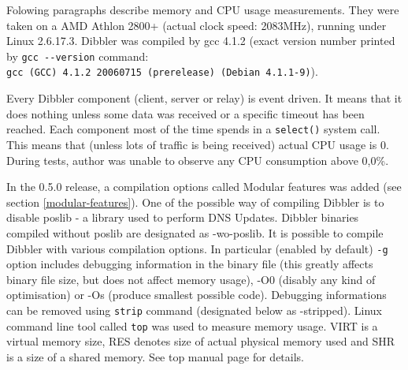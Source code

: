 Folowing paragraphs describe memory and CPU usage measurements. They
were taken on a AMD Athlon 2800+ (actual clock speed: 2083MHz),
running under Linux 2.6.17.3. Dibbler was compiled by gcc 4.1.2
(exact version number printed by \verb+gcc --version+ command: \\
\verb+gcc (GCC) 4.1.2 20060715 (prerelease) (Debian 4.1.1-9)+).

Every Dibbler component (client, server or relay) is event driven. It
means that it does nothing unless some data was received or a specific
timeout has been reached. Each component most of the time spends in a
\verb+select()+ system call. This means that (unless lots of traffic
is being received) actual CPU usage is 0. During tests, author was
unable to observe any CPU consumption above 0,0\%. 

In the 0.5.0 release, a compilation options called Modular features
was added (see section \ref{modular-features}). One of the possible
way of compiling Dibbler is to disable poslib - a library used to
perform DNS Updates. Dibbler binaries compiled without poslib are
designated as -wo-poslib. It is possible to compile Dibbler with
various compilation options. In particular (enabled by default)
\verb+-g+ option includes debugging information in the binary file
(this greatly affects binary file size, but does not affect memory
usage), -O0 (disably any kind of optimisation) or -Os (produce
smallest possible code). Debugging informations can be removed using
\verb+strip+ command (designated below as -stripped). Linux command
line tool called \verb+top+ was used to measure memory usage. VIRT is
a virtual memory size, RES denotes size of actual physical memory used
and SHR is a size of a shared memory. See top manual page for details.

